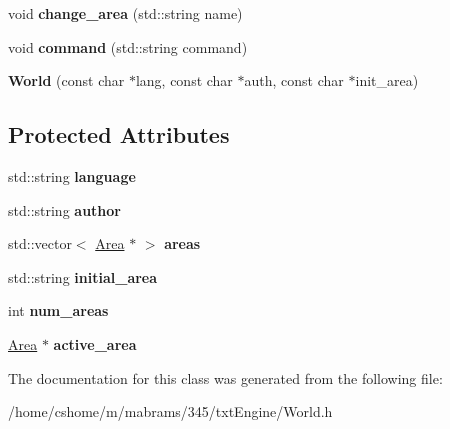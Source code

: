 \begin{DoxyCompactItemize}
\item 
\hypertarget{class_world_a2a47dcf3eb1e54a2da3729018c34d53f}{
void {\bfseries change\_\-area} (std::string name)}
\label{class_world_a2a47dcf3eb1e54a2da3729018c34d53f}

\item 
\hypertarget{class_world_a10b09bcabc16d1a2627da5b34919b496}{
void {\bfseries command} (std::string command)}
\label{class_world_a10b09bcabc16d1a2627da5b34919b496}

\item 
\hypertarget{class_world_a5d24f8974db6e08f1938389ad8937c3e}{
{\bfseries World} (const char $\ast$lang, const char $\ast$auth, const char $\ast$init\_\-area)}
\label{class_world_a5d24f8974db6e08f1938389ad8937c3e}

\end{DoxyCompactItemize}
\subsection*{Protected Attributes}
\begin{DoxyCompactItemize}
\item 
\hypertarget{class_world_a910a48419528575e44eac36d7b517057}{
std::string {\bfseries language}}
\label{class_world_a910a48419528575e44eac36d7b517057}

\item 
\hypertarget{class_world_a44a5680fc460f4b34d3ceaa66dded268}{
std::string {\bfseries author}}
\label{class_world_a44a5680fc460f4b34d3ceaa66dded268}

\item 
\hypertarget{class_world_a981e5ee0065f8bdafd268747873e0c6b}{
std::vector$<$ \hyperlink{class_area}{Area} $\ast$ $>$ {\bfseries areas}}
\label{class_world_a981e5ee0065f8bdafd268747873e0c6b}

\item 
\hypertarget{class_world_a966a1049b9bc8c1c184a840da8817ab8}{
std::string {\bfseries initial\_\-area}}
\label{class_world_a966a1049b9bc8c1c184a840da8817ab8}

\item 
\hypertarget{class_world_a5a190c6f7aed9fa156e4a2a78ddfafdb}{
int {\bfseries num\_\-areas}}
\label{class_world_a5a190c6f7aed9fa156e4a2a78ddfafdb}

\item 
\hypertarget{class_world_ab668d926b2c0fc6503ddc14974c79a81}{
\hyperlink{class_area}{Area} $\ast$ {\bfseries active\_\-area}}
\label{class_world_ab668d926b2c0fc6503ddc14974c79a81}

\end{DoxyCompactItemize}


The documentation for this class was generated from the following file:\begin{DoxyCompactItemize}
\item 
/home/cshome/m/mabrams/345/txtEngine/World.h\end{DoxyCompactItemize}
